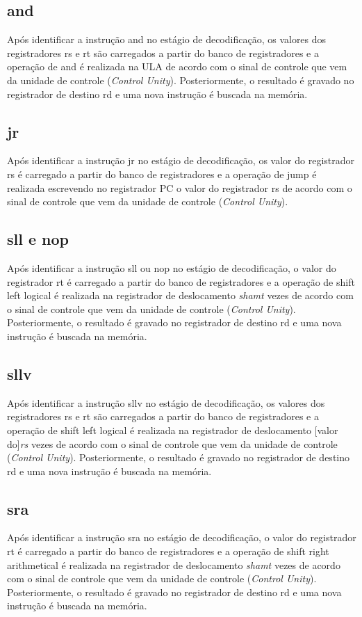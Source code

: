 \documentclass{article}
\begin{document}
    \subsection{and}
    Após identificar a instrução and no estágio de decodificação, os valores dos registradores rs e rt são carregados a partir do banco de registradores e a operação de and é realizada na ULA de acordo com o sinal de controle que vem da unidade de controle ({\it Control Unity}). Posteriormente, o resultado é gravado no registrador de destino rd e uma nova instrução é buscada na memória.
    \\    
    \subsection{jr}
    Após identificar a instrução jr no estágio de decodificação, os valor do registrador rs é carregado a partir do banco de registradores e a operação de jump é realizada escrevendo no registrador PC o valor do registrador rs de acordo com o sinal de controle que vem da unidade de controle ({\it Control Unity}).
    \\    
    \subsection{sll e nop}
    Após identificar a instrução sll ou nop no estágio de decodificação, o valor do registrador rt é carregado a partir do banco de registradores e a operação de shift left logical é realizada na registrador de deslocamento {\it shamt} vezes de acordo com o sinal de controle que vem da unidade de controle ({\it Control Unity}). Posteriormente, o resultado é gravado no registrador de destino rd e uma nova instrução é buscada na memória.
    \\    
    \subsection{sllv}
    Após identificar a instrução sllv no estágio de decodificação, os valores dos registradores rs e rt são carregados a partir do banco de registradores e a operação de shift left logical é realizada na registrador de deslocamento [valor do]{\it rs} vezes de acordo com o sinal de controle que vem da unidade de controle ({\it Control Unity}). Posteriormente, o resultado é gravado no registrador de destino rd e uma nova instrução é buscada na memória.
    \\    
    \subsection{sra}
    Após identificar a instrução sra no estágio de decodificação, o valor do registrador rt é carregado a partir do banco de registradores e a operação de shift right arithmetical é realizada na registrador de deslocamento {\it shamt} vezes de acordo com o sinal de controle que vem da unidade de controle ({\it Control Unity}). Posteriormente, o resultado é gravado no registrador de destino rd e uma nova instrução é buscada na memória.
    \\    
\end{document}
